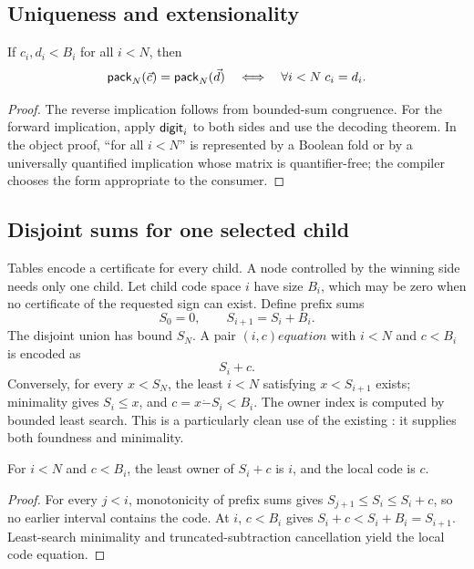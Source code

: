 \subsection{Uniqueness and extensionality}

\begin{corollary}
If \(c_i,d_i<B_i\) for all \(i<N\), then
\[
  \mathsf{pack}_N(\vec c)=\mathsf{pack}_N(\vec d)
  \quad\Longleftrightarrow\quad
  \forall i<N\;c_i=d_i.
\]
\end{corollary}

\begin{proof}
The reverse implication follows from bounded-sum congruence.  For the forward
implication, apply \(\mathsf{digit}_i\) to both sides and use the decoding theorem.  In
the object proof, ``for all \(i<N\)'' is represented by a Boolean fold or by a
universally quantified implication whose matrix is quantifier-free; the
compiler chooses the form appropriate to the consumer.
\end{proof}

\subsection{Disjoint sums for one selected child}

Tables encode a certificate for every child.  A node controlled by the winning
side needs only one child.  Let child code space \(i\) have size \(B_i\), which
may be zero when no certificate of the requested sign can exist.  Define prefix
sums
\[
  S_0=0,
  \qquad S_{i+1}=S_i+B_i.
\]
The disjoint union has bound \(S_N\).  A pair \((i,c)
equation\) with
\(i<N\) and \(c<B_i\) is encoded as
\[
  S_i+c.
\]
Conversely, for every \(x<S_N\), the least \(i<N\) satisfying
\(x<S_{i+1}\) exists; minimality gives \(S_i\le x\), and
\(c=x\mathbin{\dot{-}}S_i<B_i\).  The owner index is computed by bounded
least search.  This is a particularly clean use of the existing
: it supplies both foundness and minimality.

\begin{lemma}
For \(i<N\) and \(c<B_i\), the least owner of \(S_i+c\) is \(i\), and the local
code is \(c\).
\end{lemma}

\begin{proof}
For every \(j<i\), monotonicity of prefix sums gives
\(S_{j+1}\le S_i\le S_i+c\), so no earlier interval contains the code.  At
\(i\), \(c<B_i\) gives \(S_i+c<S_i+B_i=S_{i+1}\).  Least-search minimality and
truncated-subtraction cancellation yield the local code equation.
\end{proof}

